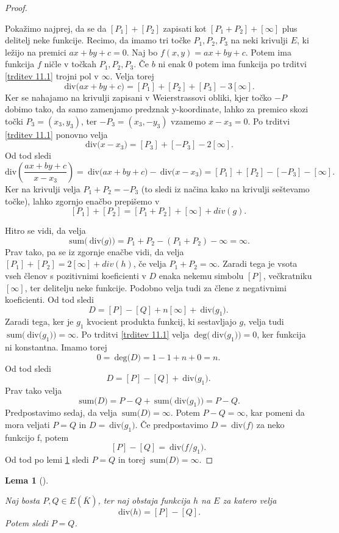 \documentclass[12pt,a4paper,twoside]{article}
\theoremstyle{definition} %
\theoremstyle{plain} %
\newtheorem{lema}[definicija]{Lema}
\numberwithin{equation}{section}  %
\newcommand{\E}[1]{E({#1})}
\newcommand{\DEG}[1]{\ \text{deg(}{#1}\text{)}}
\newcommand{\Div}[1]{\ \text{div(}{#1}\text{)}}
\newcommand{\SUM}[1]{\ \text{sum(}{#1}\text{)}}
\begin{document}
\begin{proof}~

Pokažimo najprej, da se da $[P_1]+ [P_2]$ zapisati kot $[P_1+P_2] + [\infty]$ plus delitelj neke funkcije.
Recimo, da imamo tri točke $P_1,P_2,P_3$ na neki krivulji $E$, ki ležijo na premici $ax+by+c = 0$.
Naj bo $f(x,y) = ax+by+c$. Potem ima funkcija $f$ ničle v točkah $P_1,P_2,P_3$. Če $b$ ni enak $0$ potem ima funkcija po trditvi \ref{trditev 11.1} trojni pol v $\infty$.
Velja torej $$\Div{ax+by+c} = [P_1]+[P_2]+[P_3]-3[\infty].$$
Ker se nahajamo na krivulji zapisani v Weierstrassovi obliki, kjer točko $-P$ dobimo tako, da samo zamenjamo predznak y-koordinate, lahko za premico skozi točki $P_3 = (x_3,y_3)$, ter $-P_3=(x_3,-y_3)$ vzamemo $x-x_3=0$.
Po  trditvi \ref{trditev 11.1} ponovno velja
$$\Div{x-x_3} = [P_3]+[-P_3]-2[\infty].$$
Od tod sledi
$$\text{div}\left( \frac{ax+by+c}{x-x_3}\right) = \Div{ax+by+c} - \Div{x-x_3} =[P_1]+[P_2]-[-P_3]-[\infty].$$
Ker na krivulji velja $P_1+P_2 = -P_3$ (to sledi iz načina kako na krivulji seštevamo točke), lahko zgornjo enačbo prepišemo v 
$$[P_1]+[P_2] = [P_1+P_2]+[\infty]+div(g).$$ 


Hitro se vidi, da velja
$$\SUM{\Div{g}}= P_1+P_2-(P_1+P_2)-\infty = \infty.$$
Prav tako, pa se iz zgornje enačbe vidi, da velja $[P_1]+[P_2] = 2[\infty] + div(h)$, če velja $P_1+P_2 = \infty$. Zaradi tega je vsota vseh členov s pozitivnimi koeficienti v $D$ enaka nekemu simbolu $[P]$, večkratniku $[\infty]$, ter delitelju neke funkcije. Podobno velja tudi za člene z negativnimi koeficienti. Od tod sledi
$$D = [P]-[Q]+n[\infty]+\Div{g_1}.$$
Zaradi tega, ker je $g_1$ kvocient produkta funkcij, ki sestavljajo $g$, velja tudi
\newline $\SUM{\Div{g_1}}= \infty$. Po trditvi \ref{trditev 11.1} velja $\DEG{\Div{g_1}}=0$, ker funkcija ni konstantna. Imamo torej $$0 = \DEG{D} = 1-1+n+0=n.$$
Od tod sledi
$$D = [P]-[Q] + \Div{g_1}.$$
Prav tako velja
$$\SUM{D} = P-Q+\SUM{\Div{g_1}} = P-Q.$$
Predpostavimo sedaj, da velja $\SUM{D} = \infty$. Potem $P-Q = \infty$, kar pomeni da mora veljati $P=Q$ in $D = \Div{g_1}$. Če predpostavimo $D = \Div{f}$ za neko funkcijo f, potem
$$[P]-[Q] = \Div{f/g_1}.$$
Od tod po lemi \ref{lema 11.3} sledi $P = Q$ in torej $\SUM{D} = \infty$.

\end{proof}

\begin{lema}[]~

\label{lema 11.3}

Naj bosta $P,Q \in \E{\overline{K}}$, ter naj obstaja funkcija $h$ na $E$ za katero velja
$$\Div{h}=[P]-[Q].$$
Potem sledi $P=Q$.
\end{lema}
\newpage
\end{document}
